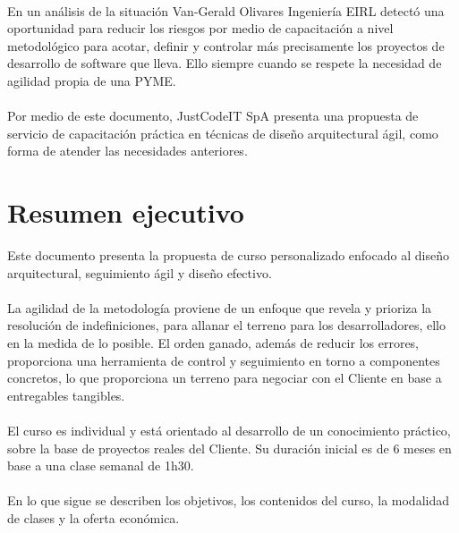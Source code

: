 \documentclass[11pt]{article}
\newcommand{\Cliente}{Van-Gerald Olivares Ingenier\'ia EIRL}
\begin{document}
\paragraph{}
En un an\'alisis de la situaci\'on \Cliente{} 
detect\'o una oportunidad para reducir los riesgos por medio de
capacitaci\'on a nivel metodol\'ogico para acotar, definir y controlar
m\'as precisamente los proyectos de desarrollo de software que lleva.
Ello siempre cuando se respete la necesidad de agilidad propia de una PYME.

\paragraph{}
Por medio de este documento,
JustCodeIT SpA presenta una propuesta de servicio de capacitaci\'on
pr\'actica en t\'ecnicas de dise\~no arquitectural \'agil,
como forma de atender las necesidades anteriores.

\tableofcontents


\newpage
\section{Resumen ejecutivo}
Este documento presenta la propuesta de curso personalizado enfocado al
dise\~no arquitectural, seguimiento \'agil y dise\~no efectivo.

\paragraph{}
La agilidad de la metodolog\'ia proviene 
de un enfoque que revela y prioriza la resoluci\'on de indefiniciones,
para allanar el terreno para los desarrolladores,
ello en la medida de lo posible.
%
El orden ganado, adem\'as de reducir los errores, proporciona una herramienta
de control y seguimiento en torno a componentes concretos,
lo que proporciona un terreno para negociar con el Cliente en base a entregables tangibles.

\paragraph{}
El curso es individual y est\'a orientado al desarrollo de un conocimiento 
pr\'actico, sobre la base de proyectos reales del Cliente.
%
Su duraci\'on inicial es de 6 meses en base a una clase semanal de 1h30.

\paragraph{}
En lo que sigue se describen los objetivos, los contenidos del curso,
la modalidad de clases y la oferta econ\'omica.
\end{document}
